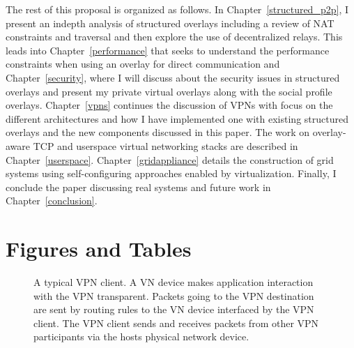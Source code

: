 The rest of this proposal is organized as follows.  In
Chapter~\ref{structured_p2p}, I present an indepth analysis of structured
overlays including a review of NAT constraints and traversal and then explore
the use of decentralized relays.  This leads into Chapter~\ref{performance} that
seeks to understand the performance constraints when using an overlay for direct
communication and Chapter~\ref{security}, where I will discuss about the security
issues in structured overlays and present my private virtual overlays along with
the social profile overlays.  Chapter~\ref{vpns} continues the discussion of
VPNs with focus on the different architectures and how I have implemented one
with existing structured overlays and the new components discussed in this
paper.  The work on overlay-aware TCP and userspace virtual networking stacks
are described in Chapter~\ref{userspace}.  Chapter~\ref{gridappliance} details
the construction of grid systems using self-configuring approaches enabled by
virtualization.  Finally, I conclude the paper discussing real systems and
future work in Chapter~\ref{conclusion}.

\section{Figures and Tables}
\begin{figure}[ht]
\centering
{}
\caption[A typical VPN client]{A typical VPN client.  A VN device makes
application interaction with the VPN transparent.  Packets going to the VPN
destination are sent by routing rules to the VN device interfaced by the VPN
client.  The VPN client sends and receives packets from other VPN participants
via the hosts physical network device.}
\label{fig:vpn}
\end{figure}
